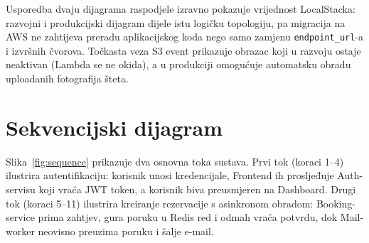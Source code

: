 \documentclass[12pt,a4paper]{article}
\begin{document}
Usporedba dvaju dijagrama raspodjele izravno pokazuje vrijednost LocalStacka: razvojni i produkcijski dijagram dijele istu logičku topologiju, pa migracija na AWS ne zahtijeva preradu aplikacijskog koda nego samo zamjenu \texttt{endpoint\_url}-a i izvršnih čvorova. Točkasta veza \guillemotleft S3 event\guillemotright{} prikazuje obrazac koji u razvoju ostaje neaktivan (Lambda se ne okida), a u produkciji omogućuje automatsku obradu uploadanih fotografija šteta.

\section{Sekvencijski dijagram}

Slika~\ref{fig:sequence} prikazuje dva osnovna toka sustava. Prvi tok (koraci 1--4) ilustrira autentifikaciju: korisnik unosi kredencijale, Frontend ih prosljeđuje Auth-servisu koji vraća JWT token, a korisnik biva preusmjeren na Dashboard. Drugi tok (koraci 5--11) ilustrira kreiranje rezervacije s asinkronom obradom: Booking-service prima zahtjev, gura poruku u Redis red i odmah vraća potvrdu, dok Mail-worker neovisno preuzima poruku i šalje e-mail.
\end{document}
